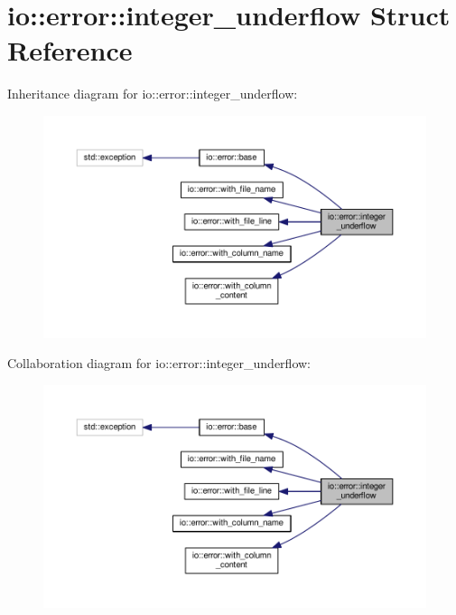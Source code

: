 \section{io\+:\+:error\+:\+:integer\+\_\+underflow Struct Reference}
\label{structio_1_1error_1_1integer__underflow}


Inheritance diagram for io\+:\+:error\+:\+:integer\+\_\+underflow\+:\nopagebreak
\begin{figure}[H]
\begin{center}
\leavevmode
\includegraphics[width=350pt]{structio_1_1error_1_1integer__underflow__inherit__graph}
\end{center}
\end{figure}


Collaboration diagram for io\+:\+:error\+:\+:integer\+\_\+underflow\+:\nopagebreak
\begin{figure}[H]
\begin{center}
\leavevmode
\includegraphics[width=350pt]{structio_1_1error_1_1integer__underflow__coll__graph}
\end{center}
\end{figure}
